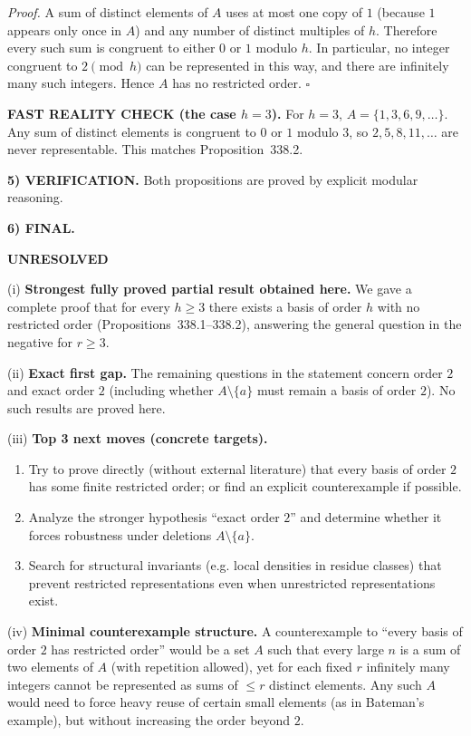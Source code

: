\noindent\emph{Proof.}
A sum of distinct elements of $A$ uses at most one copy of $1$ (because $1$ appears only once in $A$) and any number of distinct multiples of $h$.
Therefore every such sum is congruent to either $0$ or $1$ modulo $h$.
In particular, no integer congruent to $2\pmod h$ can be represented in this way, and there are infinitely many such integers. Hence $A$ has no restricted order.
\hfill$\square$

\medskip
\noindent\textbf{FAST REALITY CHECK (the case $h=3$).}
For $h=3$, $A=\{1,3,6,9,\dots\}$. Any sum of distinct elements is congruent to $0$ or $1$ modulo $3$, so $2,5,8,11,\dots$ are never representable. This matches Proposition~338.2.

\medskip
\noindent\textbf{5) VERIFICATION.}
Both propositions are proved by explicit modular reasoning.

\medskip
\noindent\textbf{6) FINAL.}

\noindent\textbf{UNRESOLVED}

\smallskip
\noindent (i) \textbf{Strongest fully proved partial result obtained here.}
We gave a complete proof that for every $h\ge 3$ there exists a basis of order $h$ with no restricted order (Propositions~338.1--338.2), answering the general question in the negative for $r\ge 3$.

\smallskip
\noindent (ii) \textbf{Exact first gap.}
The remaining questions in the statement concern order $2$ and exact order $2$ (including whether $A\setminus\{a\}$ must remain a basis of order $2$). No such results are proved here.

\smallskip
\noindent (iii) \textbf{Top 3 next moves (concrete targets).}
\begin{enumerate}
\item Try to prove directly (without external literature) that every basis of order $2$ has some finite restricted order; or find an explicit counterexample if possible.
\item Analyze the stronger hypothesis ``exact order $2$'' and determine whether it forces robustness under deletions $A\setminus\{a\}$.
\item Search for structural invariants (e.g. local densities in residue classes) that prevent restricted representations even when unrestricted representations exist.
\end{enumerate}

\smallskip
\noindent (iv) \textbf{Minimal counterexample structure.}
A counterexample to ``every basis of order $2$ has restricted order'' would be a set $A$ such that every large $n$ is a sum of two elements of $A$ (with repetition allowed), yet for each fixed $r$ infinitely many integers cannot be represented as sums of $\le r$ distinct elements. Any such $A$ would need to force heavy reuse of certain small elements (as in Bateman's example), but without increasing the order beyond $2$.



